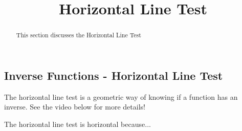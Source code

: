 \documentclass{ximera}
\title{Horizontal Line Test}
\begin{document}
\begin{abstract}
    This section discusses the Horizontal Line Test
\end{abstract}
\maketitle

\subsection*{Inverse Functions - Horizontal Line Test}

    The horizontal line test is a geometric way of knowing if a function has an inverse. See the video below for more details!
    
    
    
    
    
    \begin{problem}
        The horizontal line test is horizontal because...
        \begin{multipleChoice}
        \end{multipleChoice}
    \end{problem}
    
    
\end{document}
